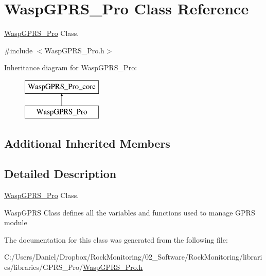 \hypertarget{class_wasp_g_p_r_s___pro}{}\section{Wasp\+G\+P\+R\+S\+\_\+\+Pro Class Reference}
\label{class_wasp_g_p_r_s___pro}


\hyperlink{class_wasp_g_p_r_s___pro}{Wasp\+G\+P\+R\+S\+\_\+\+Pro} Class.  




{\ttfamily \#include $<$Wasp\+G\+P\+R\+S\+\_\+\+Pro.\+h$>$}

Inheritance diagram for Wasp\+G\+P\+R\+S\+\_\+\+Pro\+:\begin{figure}[H]
\begin{center}
\leavevmode
\includegraphics[height=2.000000cm]{class_wasp_g_p_r_s___pro}
\end{center}
\end{figure}
\subsection*{Additional Inherited Members}


\subsection{Detailed Description}
\hyperlink{class_wasp_g_p_r_s___pro}{Wasp\+G\+P\+R\+S\+\_\+\+Pro} Class. 

Wasp\+G\+P\+RS Class defines all the variables and functions used to manage G\+P\+RS module 

The documentation for this class was generated from the following file\+:\begin{DoxyCompactItemize}
\item 
C\+:/\+Users/\+Daniel/\+Dropbox/\+Rock\+Monitoring/02\+\_\+\+Software/\+Rock\+Monitoring/libraries/libraries/\+G\+P\+R\+S\+\_\+\+Pro/\hyperlink{_wasp_g_p_r_s___pro_8h}{Wasp\+G\+P\+R\+S\+\_\+\+Pro.\+h}\end{DoxyCompactItemize}
